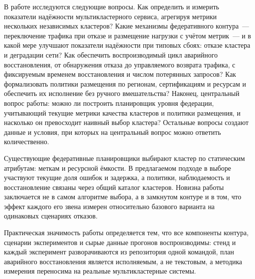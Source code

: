 В работе исследуются следующие вопросы. Как определить и измерить показатели
надёжности мультикластерного сервиса, агрегируя метрики нескольких
независимых кластеров? Какие механизмы федеративного контура~--- переключение
трафика при отказе и размещение нагрузки с учётом метрик~--- и в какой мере
улучшают показатели надёжности при типовых сбоях: отказе кластера и
деградации сети? Как обеспечить воспроизводимый цикл аварийного
восстановления, от обнаружения отказа до управляемого возврата трафика, с
фиксируемым временем восстановления и числом потерянных запросов? Как
формализовать политики размещения по регионам, сертификациям и ресурсам и
обеспечить их исполнение без ручного вмешательства? Наконец, центральный
вопрос работы: можно ли построить планировщик уровня федерации, учитывающий
текущие метрики качества кластеров и политики размещения, и насколько он
превосходит наивный выбор кластера? Остальные вопросы создают данные и
условия, при которых на центральный вопрос можно ответить количественно.

Существующие федеративные планировщики выбирают кластер по статическим
атрибутам: меткам и ресурсной ёмкости. В предлагаемом подходе в выборе
участвуют текущие доля ошибок и задержка, а политики, наблюдаемость и
восстановление связаны через общий каталог кластеров. Новизна работы
заключается не в самом алгоритме выбора, а в замкнутом контуре и в том, что
эффект каждого его звена измерен относительно базового варианта на
одинаковых сценариях отказов.

Практическая значимость работы определяется тем, что все компоненты
контура, сценарии экспериментов и сырые данные прогонов воспроизводимы:
стенд и каждый эксперимент разворачиваются из репозитория одной командой,
план аварийного восстановления является исполняемым, а не текстовым, а
методика измерения переносима на реальные мультикластерные системы.
